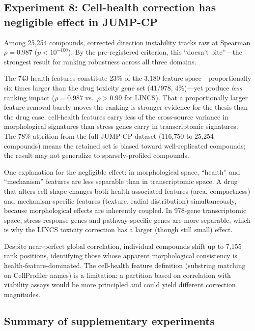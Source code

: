 \documentclass[11pt]{article}
\begin{document}
\subsection{Experiment 8: Cell-health correction has negligible
effect in JUMP-CP}

Among 25{,}254 compounds, corrected direction instability tracks raw
at Spearman $\rho = 0.987$ ($p < 10^{-100}$). By the pre-registered
criterion, this ``doesn't bite''---the strongest result for ranking
robustness across all three domains.

The 743 health features constitute 23\% of the 3{,}180-feature
space---proportionally six times larger than the drug toxicity gene set
(41/978, 4\%)---yet produce \emph{less} ranking impact ($\rho = 0.987$
vs.\ $\rho > 0.99$ for LINCS). That a proportionally larger feature
removal barely moves the ranking is stronger evidence for the thesis than
the drug case: cell-health features carry less of the cross-source
variance in morphological signatures than stress genes carry in
transcriptomic signatures. The 78\% attrition from the full JUMP-CP
dataset (116{,}750 to 25{,}254 compounds) means the retained set is
biased toward well-replicated compounds; the result may not generalize
to sparsely-profiled compounds.

One explanation for the negligible effect: in morphological space,
``health'' and ``mechanism'' features are less separable than in
transcriptomic space. A drug that alters cell shape changes both
health-associated features (area, compactness) and mechanism-specific
features (texture, radial distribution) simultaneously, because
morphological effects are inherently coupled. In 978-gene transcriptomic
space, stress-response genes and pathway-specific genes are more
separable, which is why the LINCS toxicity correction has a larger
(though still small) effect.

Despite near-perfect global correlation, individual compounds shift up
to 7{,}155 rank positions, identifying those whose apparent morphological
consistency is health-feature-dominated. The cell-health feature
definition (substring matching on CellProfiler names) is a limitation:
a partition based on correlation with viability assays would be more
principled and could yield different correction magnitudes.

\subsection{Summary of supplementary experiments}
\end{document}
